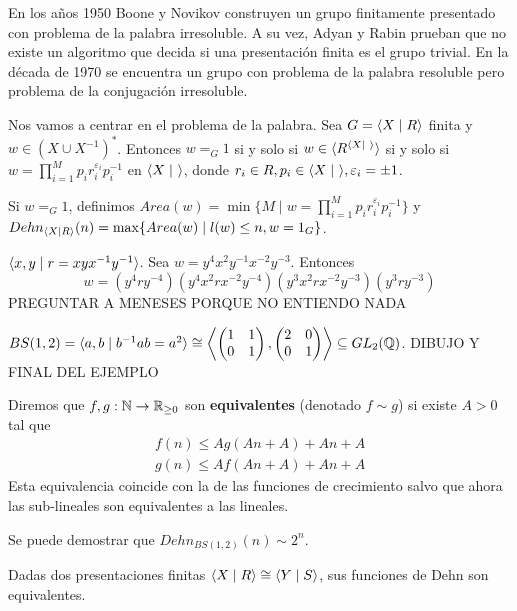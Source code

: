 \documentclass[twoside, 11pt]{article}
\begin{document}
En los años 1950 Boone y Novikov construyen un grupo finitamente presentado con problema de la palabra irresoluble. A su vez, Adyan y Rabin prueban que no existe un algoritmo que decida si una presentación finita es el grupo trivial. En la década de 1970 se encuentra un grupo con problema de la palabra resoluble pero problema de la conjugación irresoluble. 

Nos vamos a centrar en el problema de la palabra. Sea $G=\langle{X\mid R}\rangle$ finita y $w\in (X\cup X^{-1})^*$. Entonces $w=_G 1$ si y solo si $w\in \gene{R^{\gene{X\mid\ }}}$ si y solo si $w=\displaystyle\prod_{i=1}^M p_ir_i^{\varepsilon_i}p_i^{-1}$ en $\langle{X\mid\ }\rangle$, donde $r_i\in R, p_i\in\langle{X\mid\ }\rangle, \varepsilon_i=\pm 1$.

Si $w=_G 1$, definimos $Area(w)=\min\{M\mid w=\prod_{i=1}^M p_ir_i^{\varepsilon_i}p_i^{-1}\}$ y $Dehn_{\langle{X\mid R}\rangle}(n)=\max\{Area(w)\mid l(w)\leq n, w=1_G\}$.

\begin{ej}
$\langle{x,y\mid r=xyx^{-1}y^{-1}}\rangle$. Sea $w=y^4x^2y^{-1}x^{-2}y^{-3}$. Entonces
\[
w=(y^4ry^{-4})(y^{4}x^2rx^{-2}y^{-4})(y^{3}x^2rx^{-2}y^{-3})(y^3ry^{-3})
\]
PREGUNTAR A MENESES PORQUE NO ENTIENDO NADA
\end{ej}

\begin{ej}
$BS(1,2)=\langle{a,b\mid b^{-1}ab=a^2}\rangle\cong\left\langle\begin{pmatrix}
1 & 1\\
0 & 1
\end{pmatrix}, \begin{pmatrix}
2 & 0 \\
0 & 1
\end{pmatrix}\right\rangle\subseteq GL_2(\mathbb{Q})$. DIBUJO Y FINAL DEL EJEMPLO
\end{ej}

Diremos que $f,g:\mathbb{N}\to\mathbb{R}_{\geq 0}$ son \textbf{equivalentes} (denotado $f\sim g$) si existe $A>0$ tal que
\begin{gather*}
f(n)\leq Ag(An+A)+An+A\\
g(n)\leq Af(An+A)+An+A
\end{gather*}
Esta equivalencia coincide con la de las funciones de crecimiento salvo que ahora las sub-lineales son equivalentes a las lineales. 

Se puede demostrar que $Dehn_{BS(1,2)}(n)\sim 2^n$.

\begin{lemma}
Dadas dos presentaciones finitas $\langle{X\mid R}\rangle\cong \langle{Y\mid S}\rangle$, sus funciones de Dehn son equivalentes.
\end{lemma}
\end{document}
